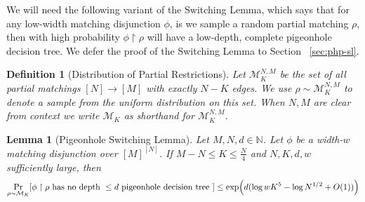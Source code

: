 \documentclass[11pt]{article}
\newtheorem{lemma}{Lemma}
\newtheorem{definition}{Definition}
\newcommand{\todo}[1]{\textcolor{red}{TODO: #1}}
\begin{document}
We will need the following variant of the Switching Lemma, which says that for any  low-width matching disjunction $\phi$, is we sample a random partial matching $\rho$, then with high probability $\phi\upharpoonright\rho$ will have a low-depth, complete pigeonhole decision tree. We defer the proof of the Switching Lemma to Section ~\ref{sec:php-sl}.

\begin{definition}[Distribution of Partial Restrictions] 
\label{}
Let $\mathcal{M}^{N,M}_K$ be the set of all partial matchings $[N] \to [M]$ with exactly $N - K$ edges. We use $\rho \sim \mathcal{M}^{N,M}_K$ to denote a sample from the uniform distribution on this set. When $N,M$ are clear from context we write $\mathcal{M}_K$ as shorthand for $\mathcal{M}^{N,M}_K$.  
\end{definition} 

\begin{lemma}[Pigeonhole Switching Lemma]
\label{lem:switching-main} 
{\it Let} $M,N,d \in \mathbb{N}$. 
{\it Let} $\phi$ {\it be a width}-$w$ {\it matching disjunction over} $[M]^{[N]}$. 
{\it If} $M-N \leq K \leq \frac{N}{4}$ {\it and} $N,K,d,w$ {\it sufficiently large, then}
\[
\Pr_{\rho \sim \mathcal{M}_K} [\phi\upharpoonright \rho \text{ has no depth } \leq d \text{ pigeonhole decision tree }] \leq \exp\Bigl(d (\log wK^5 -\log N^{1/2} + O(1))\Bigr)\]
\end{lemma}
\end{document}
